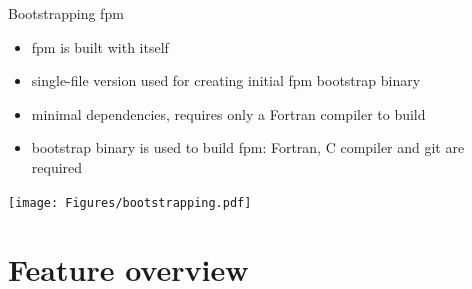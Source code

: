 \documentclass[lualatex,10pt,aspectratio=169]{beamer}
\begin{document}
\begin{frame}{Bootstrapping fpm}
   \begin{itemize}
      \item fpm is built with itself
      \item single-file version used for creating initial fpm bootstrap binary
      \item minimal dependencies, requires only a Fortran compiler to build
      \item bootstrap binary is used to build fpm: Fortran, C compiler and git are required
   \end{itemize}
   \vfill

   \centering
   \texttt{[image: Figures/bootstrapping.pdf]}
\end{frame}


\section{Feature overview}
\end{document}
